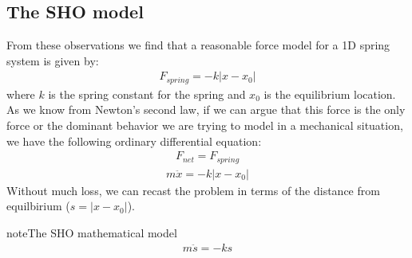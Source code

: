 \documentclass[letterpaper,10pt,english]{jupyterBook}
\begin{document}
\subsection{The SHO model}
\label{\detokenize{content/2_oscillations/readings-SHO-intro:the-sho-model}}
\sphinxAtStartPar
From these observations we find that a reasonable force model for a 1D spring system is given by:
\begin{equation*}
\begin{split}F_{spring} = -k |x-x_0|\end{split}
\end{equation*}
\sphinxAtStartPar
where \(k\) is the spring constant for the spring and \(x_0\) is the equilibrium location. As we know from Newton’s second law, if we can argue that this force is the only force or the dominant behavior we are trying to model in a mechanical situation, we have the following ordinary differential equation:
\begin{equation*}
\begin{split}F_{net} = F_{spring}\end{split}
\end{equation*}\begin{equation*}
\begin{split}m\ddot{x} = -k|x-x_0|\end{split}
\end{equation*}
\sphinxAtStartPar
Without much loss, we can recast the problem in terms of the distance from equilbirium (\(s=|x-x_0|\)). 

\begin{sphinxadmonition}{note}{The SHO mathematical model}
\begin{equation*}
\begin{split}m\ddot{s} = -ks\end{split}
\end{equation*}\end{sphinxadmonition}
\end{document}

